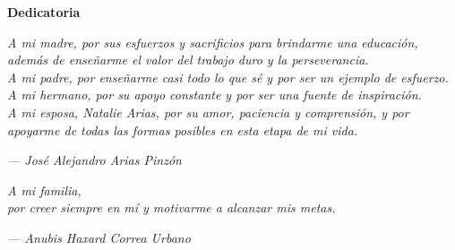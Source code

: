 \cleardoublepage%
%
\thispagestyle{empty}

\vspace*{\fill}

\begin{center}
{\Large\bfseries Dedicatoria}
\end{center}

\vspace{2cm}

\begin{center}
\textit{
    A mi madre, por sus esfuerzos y sacrificios para brindarme una educación, además de enseñarme el valor del trabajo duro y la perseverancia. \\
    A mi padre, por enseñarme casi todo lo que sé y por ser un ejemplo de esfuerzo. \\
    A mi hermano, por su apoyo constante y por ser una fuente de inspiración.\\
    A mi esposa, Natalie Arias, por su amor, paciencia y comprensión, y por apoyarme de todas las formas posibles en esta etapa de mi vida.\\
}

\vspace{2cm}

\hfill \textit{--- José Alejandro Arias Pinzón}

\vspace{3cm}

\textit{
A mi familia,\\
por creer siempre en mí y motivarme a alcanzar mis metas.
}

\vspace{2cm}

\hfill \textit{--- Anubis Haxard Correa Urbano}
\end{center}
